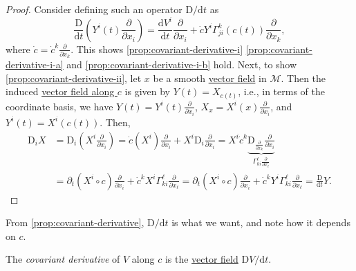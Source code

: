 \begin{proof}
	Consider defining such an operator \(\mathrm{D} / \mathrm{d} t\) as
	\[
		\frac{\mathrm{D}}{\mathrm{d}t} \left( Y^i (t)\frac{\partial}{\partial x_i} \right)
		= \frac{\mathrm{d}V^i}{\mathrm{d}t} \frac{\partial}{\partial x_i} + \dot{c}Y^i \Gamma _{ji}^k(c(t)) \frac{\partial}{\partial x_k},
	\]
	where \(\dot{c} = \dot{c}^k \frac{\partial}{\partial x_k}\). This shows \autoref{prop:covariant-derivative-i} \autoref{prop:covariant-derivative-i-a} and \autoref{prop:covariant-derivative-i-b} hold. Next, to show \autoref{prop:covariant-derivative-ii}, let \(x\) be a smooth \hyperref[def:vector-field]{vector field} in \(\mathcal{M} \). Then the induced \hyperref[def:vector-field-along-curve]{vector field along \(c\)} is given by \(Y(t)=X_{c(t)}\), i.e., in terms of the coordinate basis, we have \(Y(t) = Y^i(t)\frac{\partial}{\partial x_i}\), \(X_x= X^i(x)\frac{\partial}{\partial x_i}\), and \(Y^i(t) = X^i (c(t))\). Then,
	\[
		\begin{split}
			\mathrm{D} _i X
			&= \mathrm{D} _i \left( X^i \frac{\partial}{\partial x_i} \right)
			= \dot{c}(X^i)\frac{\partial}{\partial x_i} + X^i \mathrm{D} _i\frac{\partial}{\partial x_i}
			= X^i \dot{c}^k \underbrace{\mathrm{D} _{\frac{\partial}{\partial x_k}} \frac{\partial}{\partial x_i}}_{\Gamma _{ki}^{\ell } \frac{\partial}{\partial x_{\ell}}}\\
			&= \partial _t(X^i \circ c)\frac{\partial}{\partial x_i} + \dot{c}^k X^i \Gamma ^\ell _{ki} \frac{\partial}{\partial x_{\ell}}
			= \partial _t(X^i \circ c)\frac{\partial}{\partial x_i} + \dot{c}^k Y^i \Gamma ^\ell _{ki} \frac{\partial}{\partial x_{\ell }}
			= \frac{\mathrm{D}}{\mathrm{d} t} Y.
		\end{split}
	\]
\end{proof}

\begin{note}
	From \autoref{prop:covariant-derivative}, \(\mathrm{D} / \mathrm{d} t\) is what we want, and note how it depends on \(c\).
\end{note}

\begin{definition}\label{def:covariant-derivative}
	The \emph{covariant derivative} of \(V\) along \(c\) is the \hyperref[def:vector-field-along-curve]{vector field} \(\mathrm{D} V / \mathrm{d} t\).
\end{definition}

